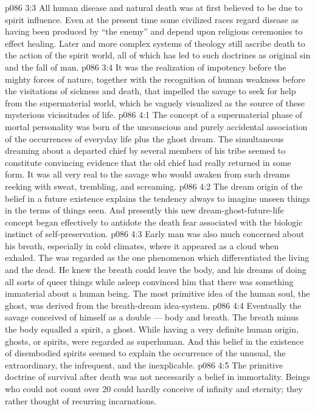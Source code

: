 \vs p086 3:3 All human disease and natural death was at first believed to be due to spirit influence. Even at the present time some civilized races regard disease as having been produced by “the enemy” and depend upon religious ceremonies to effect healing. Later and more complex systems of theology still ascribe death to the action of the spirit world, all of which has led to such doctrines as original sin and the fall of man.
\vs p086 3:4 It was the realization of impotency before the mighty forces of nature, together with the recognition of human weakness before the visitations of sickness and death, that impelled the savage to seek for help from the supermaterial world, which he vaguely visualized as the source of these mysterious vicissitudes of life.
\vs p086 4:1 The concept of a supermaterial phase of mortal personality was born of the unconscious and purely accidental association of the occurrences of everyday life plus the ghost dream. The simultaneous dreaming about a departed chief by several members of his tribe seemed to constitute convincing evidence that the old chief had really returned in some form. It was all very real to the savage who would awaken from such dreams reeking with sweat, trembling, and screaming.
\vs p086 4:2 The dream origin of the belief in a future existence explains the tendency always to imagine unseen things in the terms of things seen. And presently this new dream\hyp{}ghost\hyp{}future\hyp{}life concept began effectively to antidote the death fear associated with the biologic instinct of self\hyp{}preservation.
\vs p086 4:3 Early man was also much concerned about his breath, especially in cold climates, where it appeared as a cloud when exhaled. The  was regarded as the one phenomenon which differentiated the living and the dead. He knew the breath could leave the body, and his dreams of doing all sorts of queer things while asleep convinced him that there was something immaterial about a human being. The most primitive idea of the human soul, the ghost, was derived from the breath\hyp{}dream idea\hyp{}system.
\vs p086 4:4 Eventually the savage conceived of himself as a double --- body and breath. The breath minus the body equalled a spirit, a ghost. While having a very definite human origin, ghosts, or spirits, were regarded as superhuman. And this belief in the existence of disembodied spirits seemed to explain the occurrence of the unusual, the extraordinary, the infrequent, and the inexplicable.
\vs p086 4:5 \pc The primitive doctrine of survival after death was not necessarily a belief in immortality. Beings who could not count over 20 could hardly conceive of infinity and eternity; they rather thought of recurring incarnations.
